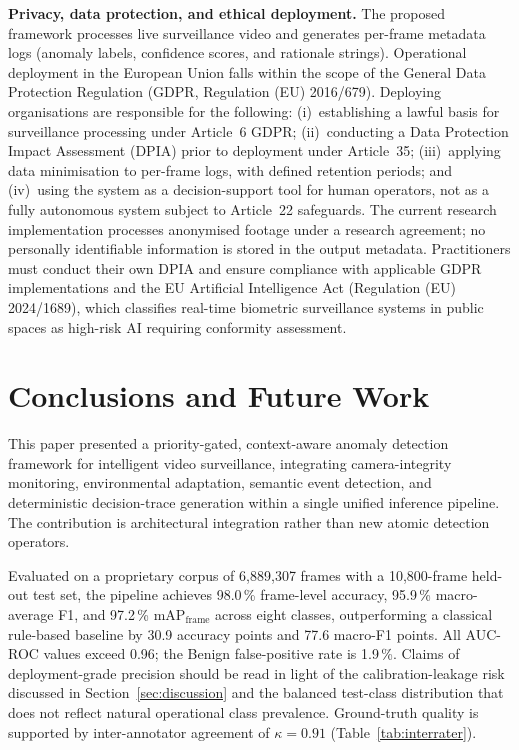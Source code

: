 \documentclass[sensors,article,submit,pdftex,moreauthors]{Definitions/mdpi}
\begin{document}
\textbf{Privacy, data protection, and ethical deployment.}
The proposed framework processes live surveillance video and generates per-frame metadata logs (anomaly labels, confidence scores, and rationale strings). Operational deployment in the European Union falls within the scope of the General Data Protection Regulation (GDPR, Regulation (EU) 2016/679). Deploying organisations are responsible for the following: (i)~establishing a lawful basis for surveillance processing under Article~6 GDPR; (ii)~conducting a Data Protection Impact Assessment (DPIA) prior to deployment under Article~35; (iii)~applying data minimisation to per-frame logs, with defined retention periods; and (iv)~using the system as a decision-support tool for human operators, not as a fully autonomous system subject to Article~22 safeguards. The current research implementation processes anonymised footage under a research agreement; no personally identifiable information is stored in the output metadata. Practitioners must conduct their own DPIA and ensure compliance with applicable GDPR implementations and the EU Artificial Intelligence Act (Regulation (EU) 2024/1689), which classifies real-time biometric surveillance systems in public spaces as high-risk AI requiring conformity assessment.

\section{Conclusions and Future Work}
\label{sec:conclusion}
 
This paper presented a priority-gated, context-aware anomaly detection framework for intelligent video surveillance, integrating camera-integrity monitoring, environmental adaptation, semantic event detection, and deterministic decision-trace generation within a single unified inference pipeline. The contribution is architectural integration rather than new atomic detection operators.
 
Evaluated on a proprietary corpus of 6{,}889{,}307 frames with a 10{,}800-frame held-out test set, the pipeline achieves 98.0\,\% frame-level accuracy, 95.9\,\% macro-average F1, and 97.2\,\% $\mathrm{mAP}_{\mathrm{frame}}$ across eight classes, outperforming a classical rule-based baseline by 30.9 accuracy points and 77.6 macro-F1 points. All AUC-ROC values exceed 0.96; the Benign false-positive rate is 1.9\,\%. Claims of deployment-grade precision should be read in light of the calibration-leakage risk discussed in Section~\ref{sec:discussion} and the balanced test-class distribution that does not reflect natural operational class prevalence. Ground-truth quality is supported by inter-annotator agreement of $\kappa = 0.91$ (Table~\ref{tab:interrater}).
 
\end{document}
